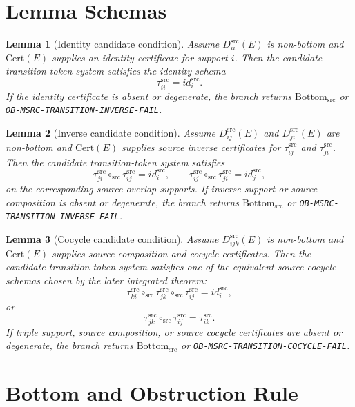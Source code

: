 \documentclass[11pt]{article}
\newcommand{\Bottomsrc}{\mathrm{Bottom}_{\mathrm{src}}}
\newtheorem{lemma}{Lemma}
\begin{document}
\section{Lemma Schemas}

\begin{lemma}[Identity candidate condition]
Assume \(D_{ii}^{\mathrm{src}}(E)\) is non-bottom and
\(\mathrm{Cert}(E)\) supplies an identity certificate for support \(i\). Then
the candidate transition-token system satisfies the identity schema
\[
  \tau_{ii}^{\mathrm{src}} = id_i^{\mathrm{src}}.
\]
If the identity certificate is absent or degenerate, the branch returns
\(\Bottomsrc\) or \texttt{OB-MSRC-TRANSITION-INVERSE-FAIL}.
\end{lemma}

\begin{lemma}[Inverse candidate condition]
Assume \(D_{ij}^{\mathrm{src}}(E)\) and \(D_{ji}^{\mathrm{src}}(E)\) are
non-bottom and \(\mathrm{Cert}(E)\) supplies source inverse certificates for
\(\tau_{ij}^{\mathrm{src}}\) and \(\tau_{ji}^{\mathrm{src}}\). Then the
candidate transition-token system satisfies
\[
  \tau_{ji}^{\mathrm{src}}\circ_{\mathrm{src}}\tau_{ij}^{\mathrm{src}}
  =
  id_i^{\mathrm{src}},
  \qquad
  \tau_{ij}^{\mathrm{src}}\circ_{\mathrm{src}}\tau_{ji}^{\mathrm{src}}
  =
  id_j^{\mathrm{src}},
\]
on the corresponding source overlap supports. If inverse support or source
composition is absent or degenerate, the branch returns \(\Bottomsrc\) or
\texttt{OB-MSRC-TRANSITION-INVERSE-FAIL}.
\end{lemma}

\begin{lemma}[Cocycle candidate condition]
Assume \(D_{ijk}^{\mathrm{src}}(E)\) is non-bottom and
\(\mathrm{Cert}(E)\) supplies source composition and cocycle certificates.
Then the candidate transition-token system satisfies one of the equivalent
source cocycle schemas chosen by the later integrated theorem:
\[
  \tau_{ki}^{\mathrm{src}}\circ_{\mathrm{src}}
  \tau_{jk}^{\mathrm{src}}\circ_{\mathrm{src}}
  \tau_{ij}^{\mathrm{src}}
  =
  id_i^{\mathrm{src}},
\]
or
\[
  \tau_{jk}^{\mathrm{src}}\circ_{\mathrm{src}}\tau_{ij}^{\mathrm{src}}
  =
  \tau_{ik}^{\mathrm{src}}.
\]
If triple support, source composition, or source cocycle certificates are
absent or degenerate, the branch returns \(\Bottomsrc\) or
\texttt{OB-MSRC-TRANSITION-COCYCLE-FAIL}.
\end{lemma}

\section{Bottom and Obstruction Rule}
\end{document}
